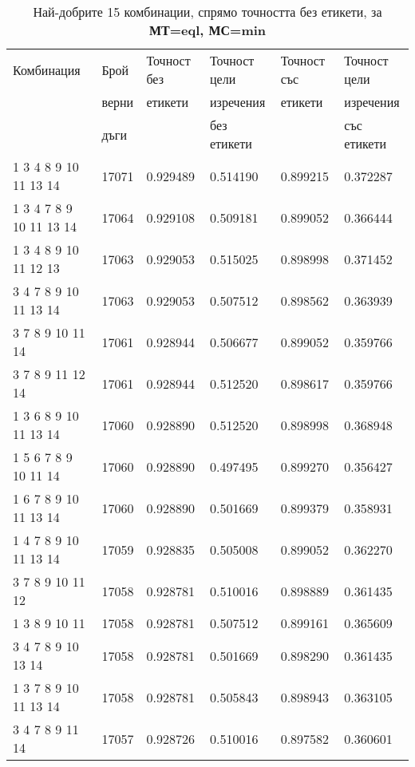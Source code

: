 \begin{table}[!htb] 
\caption{Най-добрите 15 комбинации, спрямо точността без етикети, за \textbf{МТ=eql, МС=min}}
  \begin{tabular}{|l|l|l|l|l|l|}
\hline 
Комбинация & Брой  & Точност без  & Точност цели  & Точност със  & Точност цели  \\
 & верни	& етикети & изречения & етикети & изречения \\
 & дъги	& 	& без етикети & 	& със етикети \\
\hline 
1 3 4 8 9 10 11 13 14 &	17071 &	0.929489 &	0.514190 &	0.899215 &	0.372287\\ 
\hline 
1 3 4 7 8 9 10 11 13 14 &	17064 &	0.929108 &	0.509181 &	0.899052 &	0.366444\\ 
\hline 
1 3 4 8 9 10 11 12 13 &	17063 &	0.929053 &	0.515025 &	0.898998 &	0.371452\\ 
\hline 
3 4 7 8 9 10 11 13 14 &	17063 &	0.929053 &	0.507512 &	0.898562 &	0.363939\\ 
\hline 
3 7 8 9 10 11 14 &	17061 &	0.928944 &	0.506677 &	0.899052 &	0.359766\\ 
\hline 
3 7 8 9 11 12 14 &	17061 &	0.928944 &	0.512520 &	0.898617 &	0.359766\\ 
\hline 
1 3 6 8 9 10 11 13 14 &	17060 &	0.928890 &	0.512520 &	0.898998 &	0.368948\\ 
\hline 
1 5 6 7 8 9 10 11 14 &	17060 &	0.928890 &	0.497495 &	0.899270 &	0.356427\\ 
\hline 
1 6 7 8 9 10 11 13 14 &	17060 &	0.928890 &	0.501669 &	0.899379 &	0.358931\\ 
\hline 
1 4 7 8 9 10 11 13 14 &	17059 &	0.928835 &	0.505008 &	0.899052 &	0.362270\\ 
\hline 
3 7 8 9 10 11 12 &	17058 &	0.928781 &	0.510016 &	0.898889 &	0.361435\\ 
\hline 
1 3 8 9 10 11 &	17058 &	0.928781 &	0.507512 &	0.899161 &	0.365609\\ 
\hline 
3 4 7 8 9 10 13 14 &	17058 &	0.928781 &	0.501669 &	0.898290 &	0.361435\\ 
\hline 
1 3 7 8 9 10 11 13 14 &	17058 &	0.928781 &	0.505843 &	0.898943 &	0.363105\\ 
\hline 
3 4 7 8 9 11 14 &	17057 &	0.928726 &	0.510016 &	0.897582 &	0.360601\\ 
\hline 
 \end{tabular}
 \label{tab:lab_min_eql}
 \end{table}